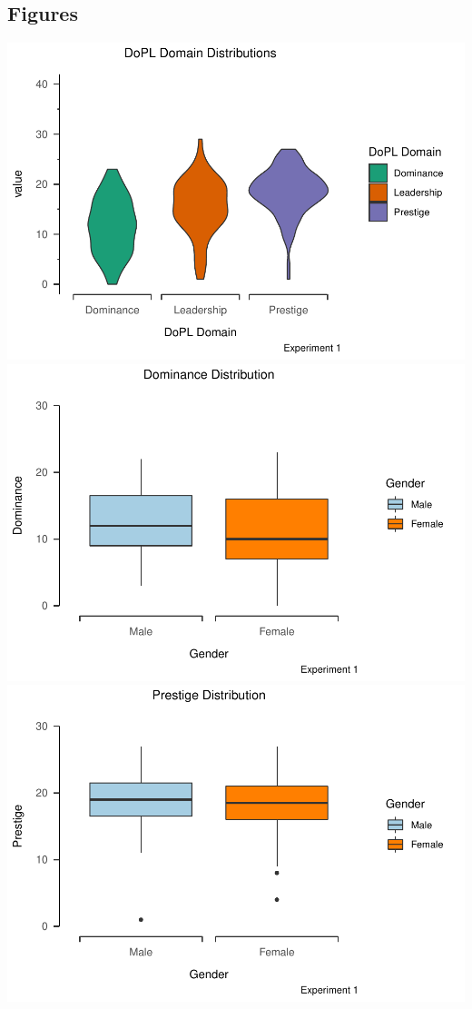 \documentclass[
  donotrepeattitle,doc, 12pt, a4paper,floatsintext]{apa7}
\begin{document}
\hypertarget{figures}{%
\subsection{Figures}\label{figures}}
\includegraphics{Output_Files/DoPL-Experiment_files/figure-latex/Dominance, Prestige, and Leadership Distribution-1.pdf}
\includegraphics{Output_Files/DoPL-Experiment_files/figure-latex/Dominance-1.pdf}
\includegraphics{Output_Files/DoPL-Experiment_files/figure-latex/Prestige-1.pdf}
\end{document}
